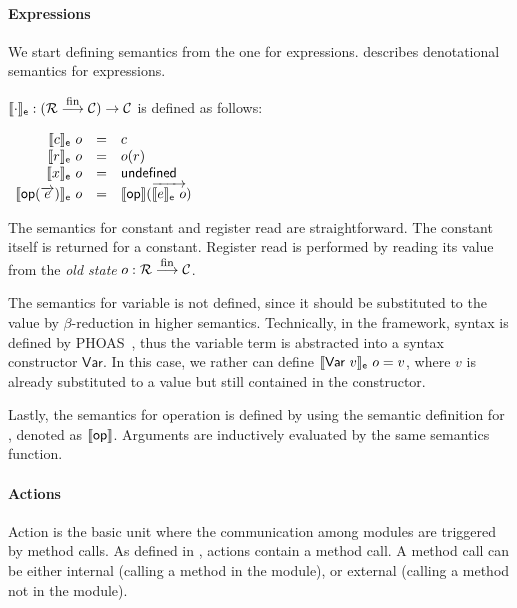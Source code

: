 \paragraph{Expressions}

We start defining semantics from the one for expressions.
 describes denotational semantics \ssemexpr{\cdot}
for expressions.

\begin{definition}
  \label{def-semexpr}
  $\llbracket \cdot \rrbracket_{\textsf{e}} : (\mathcal{R} \stackrel{\textrm{\footnotesize{fin}}}{\longrightarrow} \mathcal{C}{}) \to \mathcal{C}$ is
  defined as follows:
  \begin{center}
    \begin{math}
      \begin{array}{rcl}
        \llbracket c \rrbracket_{\textsf{e}}\ o & = & c \\
        \llbracket r \rrbracket_{\textsf{e}}\ o & = & o(r) \\
        \llbracket x \rrbracket_{\textsf{e}}\ o & = & \textsf{undefined} \\
        \llbracket \textsf{op}{}(\overrightarrow{e}) \rrbracket_{\textsf{e}}\ o & = & \llbracket \textsf{op}{} \rrbracket(\overrightarrow{\llbracket e \rrbracket_{\textsf{e}}\ o}) \\
      \end{array}
    \end{math}
  \end{center}
\end{definition}

The semantics for constant and register read are straightforward. The
constant itself is returned for a constant. Register read is performed
by reading its value from the \emph{old state} $o: \mathcal{R} \stackrel{\textrm{\footnotesize{fin}}}{\longrightarrow} \mathcal{C}$.

The semantics for variable is not defined, since it should be
substituted to the value by $\beta$-reduction in higher
semantics. Technically, in the \Kami{} framework, syntax is defined by
PHOAS~\cite{adam-icfp}, thus the variable term is abstracted into a
syntax constructor $\textsf{Var}$. In this case, we rather can define
$\llbracket \textsf{Var}\ v \rrbracket_{\textsf{e}}\ o = v$, where $v$ is already substituted
to a value but still contained in the constructor.

Lastly, the semantics for operation is defined by using the semantic
definition for \seop{}, denoted as $\llbracket \textsf{op}{} \rrbracket$. Arguments are
inductively evaluated by the same semantics function.

\paragraph{Actions}

Action is the basic unit where the communication among modules are
triggered by method calls. As defined in , actions
contain a method call. A method call can be either internal (calling a
method in the module), or external (calling a method not in the
module).


